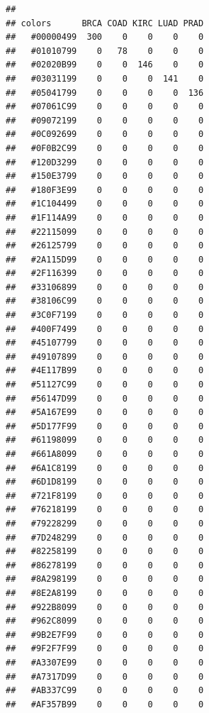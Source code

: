 \documentclass[
]{article}
\newenvironment{Shaded}{\begin{snugshade}}{\end{snugshade}}
\newcommand{\FunctionTok}[1]{\textcolor[rgb]{0.00,0.00,0.00}{#1}}
\newcommand{\NormalTok}[1]{#1}
\newcommand{\OtherTok}[1]{\textcolor[rgb]{0.56,0.35,0.01}{#1}}
\newcommand{\SpecialCharTok}[1]{\textcolor[rgb]{0.00,0.00,0.00}{#1}}
\theoremstyle{definition}
\theoremstyle{definition}
\theoremstyle{definition}
\theoremstyle{definition}
\theoremstyle{remark}
\begin{document}
\begin{Shaded}
\end{Shaded}

\begin{verbatim}
##            
## colors      BRCA COAD KIRC LUAD PRAD
##   #00000499  300    0    0    0    0
##   #01010799    0   78    0    0    0
##   #02020B99    0    0  146    0    0
##   #03031199    0    0    0  141    0
##   #05041799    0    0    0    0  136
##   #07061C99    0    0    0    0    0
##   #09072199    0    0    0    0    0
##   #0C092699    0    0    0    0    0
##   #0F0B2C99    0    0    0    0    0
##   #120D3299    0    0    0    0    0
##   #150E3799    0    0    0    0    0
##   #180F3E99    0    0    0    0    0
##   #1C104499    0    0    0    0    0
##   #1F114A99    0    0    0    0    0
##   #22115099    0    0    0    0    0
##   #26125799    0    0    0    0    0
##   #2A115D99    0    0    0    0    0
##   #2F116399    0    0    0    0    0
##   #33106899    0    0    0    0    0
##   #38106C99    0    0    0    0    0
##   #3C0F7199    0    0    0    0    0
##   #400F7499    0    0    0    0    0
##   #45107799    0    0    0    0    0
##   #49107899    0    0    0    0    0
##   #4E117B99    0    0    0    0    0
##   #51127C99    0    0    0    0    0
##   #56147D99    0    0    0    0    0
##   #5A167E99    0    0    0    0    0
##   #5D177F99    0    0    0    0    0
##   #61198099    0    0    0    0    0
##   #661A8099    0    0    0    0    0
##   #6A1C8199    0    0    0    0    0
##   #6D1D8199    0    0    0    0    0
##   #721F8199    0    0    0    0    0
##   #76218199    0    0    0    0    0
##   #79228299    0    0    0    0    0
##   #7D248299    0    0    0    0    0
##   #82258199    0    0    0    0    0
##   #86278199    0    0    0    0    0
##   #8A298199    0    0    0    0    0
##   #8E2A8199    0    0    0    0    0
##   #922B8099    0    0    0    0    0
##   #962C8099    0    0    0    0    0
##   #9B2E7F99    0    0    0    0    0
##   #9F2F7F99    0    0    0    0    0
##   #A3307E99    0    0    0    0    0
##   #A7317D99    0    0    0    0    0
##   #AB337C99    0    0    0    0    0
##   #AF357B99    0    0    0    0    0

\end{verbatim}
\end{document}
